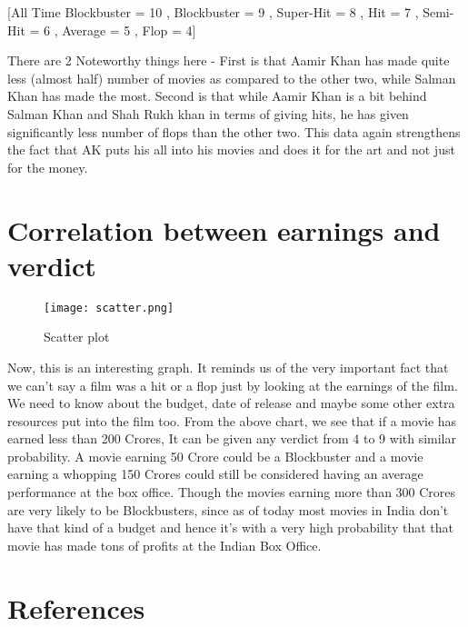 \documentclass[12pt]{article}
\begin{document}
[All Time Blockbuster = 10
    , Blockbuster = 9
    , Super-Hit = 8
    , Hit = 7
    , Semi-Hit = 6
    , Average = 5
    , Flop = 4]
    \newline
    \newline

There are 2 Noteworthy things here - First is that Aamir Khan has made quite less (almost half) number of movies as compared to the other two, while Salman Khan has made the most.
\newline
Second is that while Aamir Khan is a bit behind Salman Khan and Shah Rukh khan in terms of giving hits, he has given significantly less number of flops than the other two. 
\newline
This data again strengthens the fact that AK puts his all into his movies and does it for the art and not just for the money.  

\clearpage

\section{Correlation between earnings and verdict}

\begin{figure}[h]
    \texttt{[image: scatter.png]}
    \caption{Scatter plot}
    \label{fig:Verdict}
\end{figure}

Now, this is an interesting graph. It reminds us of the very important fact that we can't say a film was a hit or a flop just by looking at the earnings of the film. We need to know about the budget, date of release and maybe some other extra resources put into the film too.
\newline
\newline
From the above chart, we see that if a movie has earned less than 200 Crores, It can be given any verdict from 4 to 9 with similar probability. A movie earning 50 Crore could be a Blockbuster and a movie earning a whopping 150 Crores could still be considered having an average performance at the box office.  
\newline
Though the movies earning more than 300 Crores are very likely to be Blockbusters, since as of today most movies in India don't have that kind of a budget and hence it's with a very high probability that that movie has made tons of profits at the Indian Box Office. 

\clearpage

\section{References}
\end{document}
